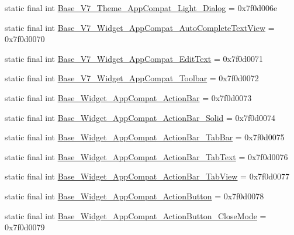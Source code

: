 \begin{DoxyCompactItemize}
\item 
static final int \mbox{\hyperlink{classandroid_1_1support_1_1design_1_1R_1_1style_a991ccb5eb4946b399bde90052ef1e6e3}{Base\+\_\+\+V7\+\_\+\+Theme\+\_\+\+App\+Compat\+\_\+\+Light\+\_\+\+Dialog}} = 0x7f0d006e
\item 
static final int \mbox{\hyperlink{classandroid_1_1support_1_1design_1_1R_1_1style_ad851a8db0e50a006775dd76e7efa50fe}{Base\+\_\+\+V7\+\_\+\+Widget\+\_\+\+App\+Compat\+\_\+\+Auto\+Complete\+Text\+View}} = 0x7f0d0070
\item 
static final int \mbox{\hyperlink{classandroid_1_1support_1_1design_1_1R_1_1style_a5143acab4e9a04013d7635ffc30fa84c}{Base\+\_\+\+V7\+\_\+\+Widget\+\_\+\+App\+Compat\+\_\+\+Edit\+Text}} = 0x7f0d0071
\item 
static final int \mbox{\hyperlink{classandroid_1_1support_1_1design_1_1R_1_1style_a03c5401b8fb72009859d68e558da6a62}{Base\+\_\+\+V7\+\_\+\+Widget\+\_\+\+App\+Compat\+\_\+\+Toolbar}} = 0x7f0d0072
\item 
static final int \mbox{\hyperlink{classandroid_1_1support_1_1design_1_1R_1_1style_a5b57339be3b00ec4fbc6d3baa428c01b}{Base\+\_\+\+Widget\+\_\+\+App\+Compat\+\_\+\+Action\+Bar}} = 0x7f0d0073
\item 
static final int \mbox{\hyperlink{classandroid_1_1support_1_1design_1_1R_1_1style_a1f9e47e1c00a31c23b8ac75d6b4adb6b}{Base\+\_\+\+Widget\+\_\+\+App\+Compat\+\_\+\+Action\+Bar\+\_\+\+Solid}} = 0x7f0d0074
\item 
static final int \mbox{\hyperlink{classandroid_1_1support_1_1design_1_1R_1_1style_aa4eca4c56c553fe2c7950b72fefae483}{Base\+\_\+\+Widget\+\_\+\+App\+Compat\+\_\+\+Action\+Bar\+\_\+\+Tab\+Bar}} = 0x7f0d0075
\item 
static final int \mbox{\hyperlink{classandroid_1_1support_1_1design_1_1R_1_1style_aa8ddc5fdad0f299e2b52eddda088ebe8}{Base\+\_\+\+Widget\+\_\+\+App\+Compat\+\_\+\+Action\+Bar\+\_\+\+Tab\+Text}} = 0x7f0d0076
\item 
static final int \mbox{\hyperlink{classandroid_1_1support_1_1design_1_1R_1_1style_a2dad992aa3516234c551f7f759ff3b28}{Base\+\_\+\+Widget\+\_\+\+App\+Compat\+\_\+\+Action\+Bar\+\_\+\+Tab\+View}} = 0x7f0d0077
\item 
static final int \mbox{\hyperlink{classandroid_1_1support_1_1design_1_1R_1_1style_a4c4022741dec751bc0474b30cc3f7ac7}{Base\+\_\+\+Widget\+\_\+\+App\+Compat\+\_\+\+Action\+Button}} = 0x7f0d0078
\item 
static final int \mbox{\hyperlink{classandroid_1_1support_1_1design_1_1R_1_1style_a0b796011a9c0f9cf164281e2217c9300}{Base\+\_\+\+Widget\+\_\+\+App\+Compat\+\_\+\+Action\+Button\+\_\+\+Close\+Mode}} = 0x7f0d0079

\end{DoxyCompactItemize}
